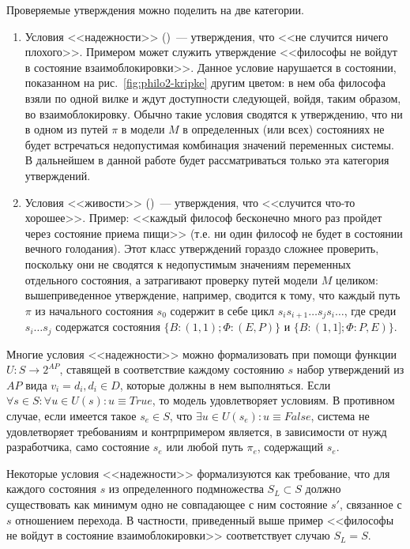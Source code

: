 Проверяемые утверждения можно поделить на две категории.
\begin{enumerate}
\item Условия <<надежности>> ()~--- утверждения, что <<не случится ничего
  плохого>>. Примером может служить утверждение <<философы не войдут в состояние
  взаимоблокировки>>. Данное условие нарушается в состоянии, показанном на
  рис.~\ref{fig:philo2-kripke} другим цветом: в нем оба философа взяли по одной вилке и
  ждут доступности следующей, войдя, таким образом, во взаимоблокировку. Обычно такие
  условия сводятся к утверждению, что ни в одном из путей $\pi$ в модели $M$ в
  определенных (или всех) состояниях не будет встречаться недопустимая комбинация значений
  переменных системы. В дальнейшем в данной работе будет рассматриваться только эта
  категория утверждений.
\item Условия <<живости>> ()~--- утверждения, что <<случится что-то
  хорошее>>. Пример: <<каждый философ бесконечно много раз пройдет через состояние приема
  пищи>> (т.е. ни один философ не будет в состоянии вечного голодания). Этот класс
  утверждений гораздо сложнее проверить, поскольку они не сводятся к недопустимым
  значениям переменных отдельного состояния, а затрагивают проверку путей модели $M$
  целиком: вышеприведенное утверждение, например, сводится к тому, что каждый путь $\pi$
  из начального состояния $s_0$ содержит в себе цикл $s_is_{i+1}\ldots s_js_i\ldots$, где
  среди $s_i\ldots s_j$ содержатся состояния $\{B: (1, 1); \Phi: (E, P)\}$ и $\{B: (1, 1];
  \Phi: P, E)\}$.
\end{enumerate}

Многие условия <<надежности>> можно формализовать при помощи функции $U\colon S
\rightarrow 2^{AP}$, ставящей в соответствие каждому состоянию $s$ набор утверждений из
$AP$ вида $v_i = d_i, d_i \in D$, которые должны в нем выполняться. Если $\forall s \in
S:\forall u \in U(s):u \equiv True$, то модель удовлетворяет условиям. В противном случае,
если имеется такое $s_e \in S$, что $\exists u \in U(s_e)\colon u \equiv False$, система
не удовлетворяет требованиям и контрпримером является, в зависимости от нужд разработчика,
само состояние $s_e$ или любой путь $\pi_e$, содержащий $s_e$.

Некоторые условия <<надежности>> формализуются как требование, что для каждого состояния
$s$ из определенного подмножества $S_L \subset S$ должно существовать как минимум одно не
совпадающее с ним состояние $s'$, связанное с $s$ отношением перехода. В частности,
приведенный выше пример <<философы не войдут в состояние взаимоблокировки>> соответствует
случаю $S_L = S$.

